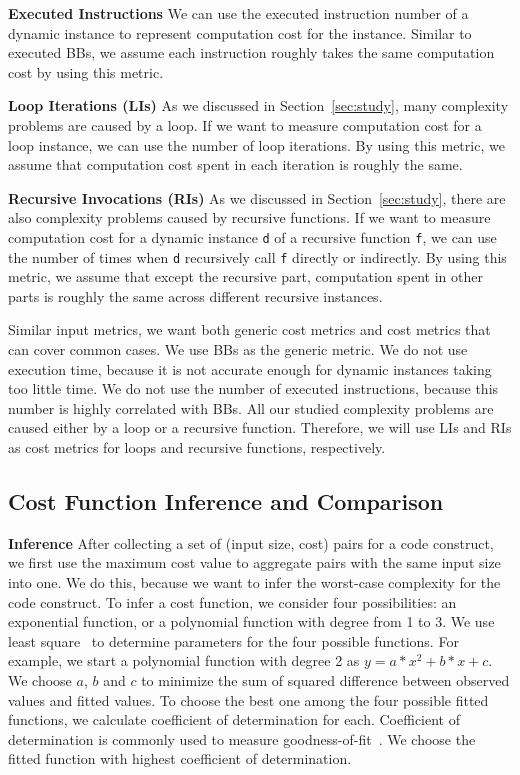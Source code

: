 \noindent\textbf{Executed Instructions}
We can use the executed instruction number of a dynamic 
instance to represent computation cost for the instance. 
Similar to executed BBs, we assume each instruction 
roughly takes the same computation cost by using this metric. 


\noindent\textbf{{Loop Iterations (LIs)}}
As we discussed in Section~\ref{sec:study},
many complexity problems are caused by a loop.
If we want to measure computation cost for a loop instance,
we can use the number of loop iterations.
By using this metric, we assume that computation 
cost spent in each iteration is roughly the same. 

\noindent\textbf{Recursive Invocations (RIs)}
As we discussed in Section~\ref{sec:study},
there are also complexity problems caused by recursive functions.
If we want to measure computation cost for a dynamic instance \texttt{d}
of a recursive function \texttt{f}, 
we can use the number of times when
\texttt{d} recursively call \texttt{f} directly or indirectly. 
By using this metric, 
we assume that except the recursive part, 
computation spent in other parts is roughly 
the same across different recursive instances. 

Similar input metrics,
we want both generic cost metrics and cost metrics that can cover common cases. 
We use BBs as the generic metric.
We do not use execution time, 
because it is not accurate enough for dynamic instances taking too little time.
We do not use the number of executed instructions, 
because this number is highly correlated with BBs.  
All our studied complexity problems are caused either by a loop or a recursive function. 
Therefore, we will use LIs and RIs as cost metrics for loops and recursive functions, 
respectively. %


\subsection{Cost Function Inference and Comparison}

\noindent\textbf{Inference}
After collecting a set of (input size, cost) pairs for a code construct,
we first use the maximum cost value to aggregate pairs with the same input size into one.
We do this, because we want to infer the worst-case complexity for the code construct. 
To infer a cost function,
we consider four possibilities: 
an exponential function, or a polynomial function with degree from 1 to 3.
We use least square~\cite{least} to determine parameters for the four possible functions. 
For example, we start a polynomial function with degree 2 as $y=a*x^2 + b*x +c$.
We choose $a$, $b$ and $c$ to minimize the sum of squared difference between 
observed values and fitted values.  
To choose the best one among the four possible fitted functions, 
we calculate coefficient of determination for each. 
Coefficient of determination is commonly used to measure goodness-of-fit~\cite{codeter}.
We choose the fitted function with highest coefficient of determination. 


